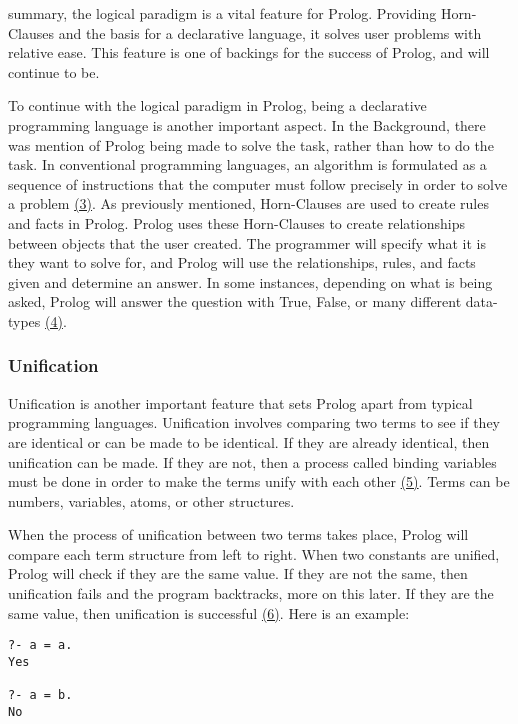 \documentclass{article}
\theoremstyle{theorem}
\theoremstyle{definition}
\theoremstyle{remark}
\begin{document}
\noindent\newline summary, the logical paradigm is a vital feature for Prolog. Providing Horn-Clauses and the basis for a declarative language, it solves user problems with relative ease. This feature is one of backings for the success of Prolog, and will continue to be. 

\noindent\newline To continue with the logical paradigm in Prolog, being a declarative programming language is another important aspect. In the Background, there was mention of Prolog being made to solve the task, rather than how to do the task. In conventional programming languages, an algorithm is formulated as a sequence of instructions that the computer must follow precisely in order to solve a problem \href{https://www.simplilearn.com/tutorials/data-structure-tutorial/what-is-an-algorithm}{(3)}. As previously mentioned, Horn-Clauses are used to create rules and facts in Prolog. Prolog uses these Horn-Clauses to create relationships between objects that the user created. The programmer will specify what it is they want to solve for, and Prolog will use the relationships, rules, and facts given and determine an answer. In some instances, depending on what is being asked, Prolog will answer the question with True, False, or many different data-types \href{https://medium.com/@donepudisreeharsha/data-types-abstraction-expressions-in-prolog-6c7251477677}{(4)}. 


\subsubsection{Unification}
Unification is another important feature that sets Prolog apart from typical programming languages. Unification involves comparing two terms to see if they are identical or can be made to be identical. If they are already identical, then unification can be made. If they are not, then a process called binding variables must be done in order to make the terms unify with each other \href{https://www.educba.com/prolog-unification/}{(5)}. Terms can be numbers, variables, atoms, or other structures. 

\noindent\newline When the process of unification between two terms takes place, Prolog will compare each term structure from left to right. When two constants are unified, Prolog will check if they are the same value. If they are not the same, then unification fails and the program backtracks, more on this later. If they are the same value, then unification is successful \href{https://www.dai.ed.ac.uk/groups/ssp/bookpages/quickprolog/node12.html}{(6)}. Here is an example:
\begin{verbatim}
?- a = a.
Yes

?- a = b.
No

\end{verbatim}
\end{document}
